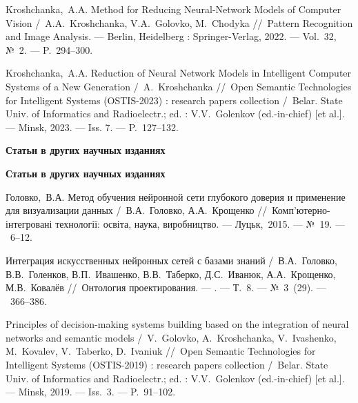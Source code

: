 Kroshchanka,~A.A. Method for Reducing Neural-Network Models of Computer Vision /~A.A.~Kroshchanka, V.A.~Golovko, M.~Chodyka
\newblock //~Pattern Recognition and Image Analysis. ---
\newblock Berlin, Heidelberg : Springer-Verlag, 2022. ---
\newblock Vol.~32, №~2. ---
\newblock P.~294--300.

Kroshchanka,~A.A. Reduction of Neural Network Models in Intelligent Computer Systems of a New Generation /~A.~Kroshchanka
\newblock //~Open Semantic Technologies for Intelligent Systems (OSTIS-2023) : research papers collection
\newblock /~Belar. State Univ. of Informatics and Radioelectr.; ed. : V.V.~Golenkov (ed.-in-chief) [et al.]. ---
\newblock Minsk, 2023. ---
\newblock Iss. 7. ---
\newblock P.~127--132.

\ifx\isabstract\undefined 
\begin{center}
\vspace{3mm}
{\bf Статьи в других научных изданиях}
\vspace{3mm}
\end{center}
\else
\vspace{22mm}
{\bf Статьи в других научных изданиях}
\vspace{2mm}
\fi

Головко,~В.А. Метод обучения нейронной сети глубокого доверия и применение для визуализации данных /~В.А.~Головко, А.А.~Крощенко
\newblock //~Комп'ютерно-інтегровані технології: освіта, наука, виробництво. ---
\newblock \mbox{Луцьк},~2015. ---
\newblock №~19. ---
~6--12.

Интеграция искусственных нейронных сетей с базами знаний /~В.А.~Головко, В.В.~Голенков, В.П.~Ивашенко, В.В.~Таберко, Д.С.~Иванюк, А.А.~Крощенко, М.В.~Ковалёв
\newblock //~Онтология проектирования. ---
. ---
\newblock Т.~8. ---
\newblock №~3~(29). ---
~366--386.

Principles of decision-making systems building based on the integration of neural networks and semantic models /~V.~Golovko, A.~Kroshchanka, V.~Ivashenko, M.~Kovalev, V.~Taberko, D.~Ivaniuk
\newblock //~Open Semantic Technologies for Intelligent Systems (OSTIS-2019) : research papers collection
\newblock /~Belar. State Univ. of Informatics and Radioelectr.; ed. : V.V.~Golenkov (ed.-in-chief) [et al.]. ---
\newblock Minsk, 2019. ---
\newblock Iss.~3. ---
\newblock P.~91--102.

